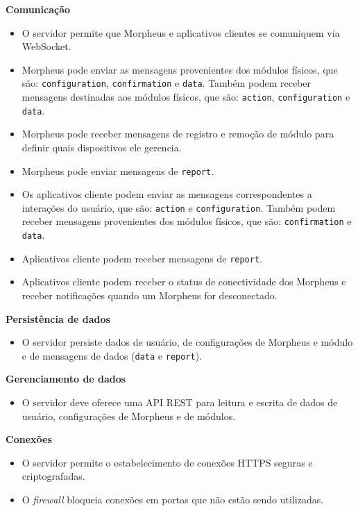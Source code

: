 \begin{description}

\item \textbf{Comunicação}

\begin{itemize}
\item O servidor permite que Morpheus e aplicativos clientes se comuniquem via WebSocket.
\item Morpheus pode enviar as mensagens provenientes dos módulos físicos, que são: \texttt{configuration}, \texttt{confirmation} e \texttt{data}. Também podem receber mensagens destinadas aos módulos físicos, que são: \texttt{action}, \texttt{configuration} e \texttt{data}.
\item Morpheus pode receber mensagens de registro e remoção de módulo para definir quais dispositivos ele gerencia.
\item Morpheus pode enviar mensagens de \texttt{report}.
\item Os aplicativos cliente podem enviar as mensagens correspondentes a interações do usuário, que são: \texttt{action} e \texttt{configuration}. Também podem receber mensagens provenientes dos módulos físicos, que são: \texttt{confirmation} e \texttt{data}.
\item Aplicativos cliente podem receber mensagens de \texttt{report}.
\item Aplicativos cliente podem receber o status de conectividade dos Morpheus e receber notificações quando um Morpheus for desconectado.
\end{itemize}

\item \textbf{Persistência de dados}

\begin{itemize}
\item O servidor persiste dados de usuário, de configurações de Morpheus e módulo e de mensagens de dados (\texttt{data} e \texttt{report}).
\end{itemize}

\item \textbf{Gerenciamento de dados}

\begin{itemize}
\item O servidor deve oferece uma API REST para leitura e escrita de dados de usuário, configurações de Morpheus e de módulos.
\end{itemize}

\item \textbf{Conexões}

\begin{itemize}
\item O servidor permite o estabelecimento de conexões HTTPS seguras e criptografadas.
\item O \emph{firewall} bloqueia conexões em portas que não estão sendo utilizadas.
\end{itemize}

\end{description}

